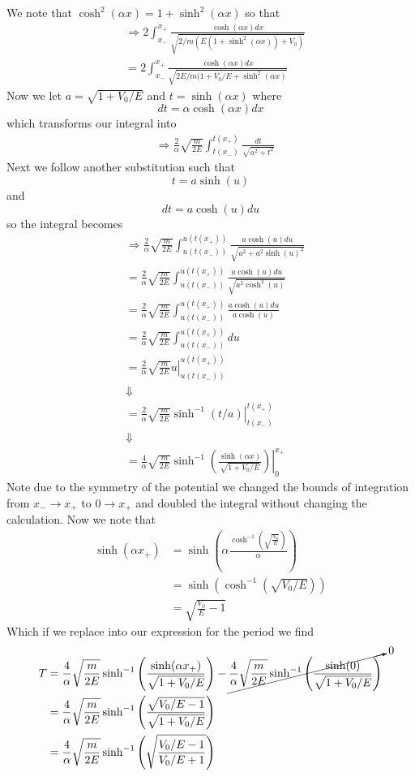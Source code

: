 \documentclass[11pt]{article}
\numberwithin{equation}{section}
\begin{document}
\begin{enumerate}[(a)]
We note that $\cosh^2(\alpha x) = 1 + \sinh^2(\alpha x)$ so that
\begin{align*}
&\Rightarrow 2\int_{x_-}^{x_+}\frac{\cosh(\alpha x)dx}{\sqrt{2/m(E(1+\sinh^2(\alpha x))+V_0)}}\\
&= 2\int_{x_-}^{x_+}\frac{\cosh(\alpha x)dx}{\sqrt{2E/m(1+V_0/E+\sinh^2(\alpha x)}}
\end{align*}
Now we let $a = \sqrt{1+V_0/E}$ and $t = \sinh(\alpha x)$ where
$$dt = \alpha\cosh(\alpha x) dx$$
which transforms our integral into
\begin{align*}
&\Rightarrow\frac{2}{\alpha}\sqrt{\frac{m}{2E}}\int_{t(x_-)}^{t(x_+)}\frac{dt}{\sqrt{a^2+t^2}}
\end{align*}
Next we follow another substitution such that
$$t = a\sinh(u)$$
and
$$dt = a\cosh(u)du$$
so the integral becomes
\begin{align*}
&\Rightarrow\frac{2}{\alpha}\sqrt{\frac{m}{2E}}\int_{u(t(x_-))}^{u(t(x_+))}\frac{a\cosh(u)du}{\sqrt{a^2+a^2\sinh(u)^2}}\\
&= \frac{2}{\alpha}\sqrt{\frac{m}{2E}}\int_{u(t(x_-))}^{u(t(x_+))}\frac{a\cosh(u)du}{\sqrt{a^2\cosh^2(u)}}\\
&= \frac{2}{\alpha}\sqrt{\frac{m}{2E}}\int_{u(t(x_-))}^{u(t(x_+))}\frac{a\cosh(u)du}{a\cosh(u)}\\
&= \frac{2}{\alpha}\sqrt{\frac{m}{2E}}\int_{u(t(x_-))}^{u(t(x_+))}du\\
&= \left.\frac{2}{\alpha}\sqrt{\frac{m}{2E}}u\right|_{u(t(x_-))}^{u(t(x_+))}\\
&\Downarrow\\
&= \left.\frac{2}{\alpha}\sqrt{\frac{m}{2E}}\sinh^{-1}(t/a)\right|_{t(x_-)}^{t(x_+)}\\
&\Downarrow\\
&= \left.\frac{4}{\alpha}\sqrt{\frac{m}{2E}}\sinh^{-1}\left(\frac{\sinh(\alpha x)}{\sqrt{1+V_0/E}}\right)\right|_{0}^{x_+}
\end{align*}
Note due to the symmetry of the potential we changed the bounds of integration from 
$x_-\rightarrow x_+$ to $0\rightarrow x_+$ and doubled the integral without changing the
calculation. Now we note that
\begin{align*}
\sinh(\alpha x_+) &= \sinh\left(\alpha\frac{\cosh^{-1}\left(\sqrt{\frac{V_0}{E}}\right)}{\alpha}\right)\\
&= \sinh\left(\cosh^{-1}\left(\sqrt{V_0/E}\right)\right)\\
&= \sqrt{\frac{V_0}{E}-1}
\end{align*}
Which if we replace into our expression for the period we find
\begin{align*}
T &= \frac{4}{\alpha}\sqrt{\frac{m}{2E}}\sinh^{-1}\left(\frac{\sinh(\alpha x_+)}{\sqrt{1+V_0/E}}\right) - \cancelto{0}{\frac{4}{\alpha}\sqrt{\frac{m}{2E}}\sinh^{-1}\left(\frac{\sinh(0)}{\sqrt{1+V_0/E}}\right)}\\
&= \frac{4}{\alpha}\sqrt{\frac{m}{2E}}\sinh^{-1}\left(\frac{\sqrt{V_0/E-1}}{\sqrt{1+V_0/E}}\right)\\
&= \frac{4}{\alpha}\sqrt{\frac{m}{2E}}\sinh^{-1}\left(\sqrt{\frac{V_0/E-1}{V_0/E+1}}\right)
\end{align*}


\end{enumerate}
\end{document}
